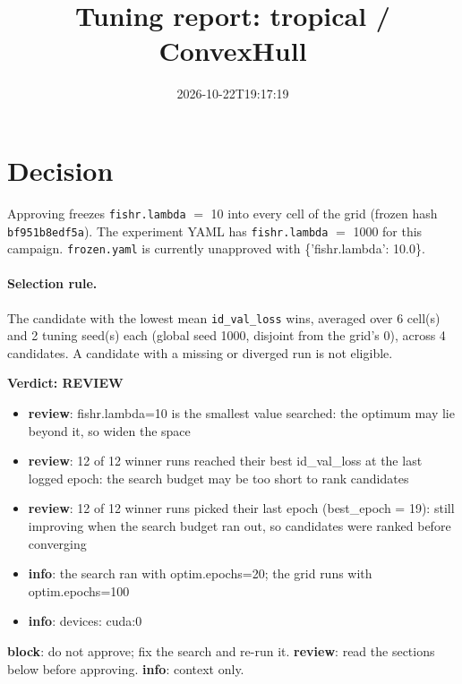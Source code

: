 \documentclass[10pt]{article}
\title{Tuning report: tropical / ConvexHull}
\date{2026-10-22T19:17:19}
\begin{document}
\maketitle

\section{Decision}
Approving freezes
\texttt{fishr.lambda} $=$ 10 into every cell of the grid (frozen hash \texttt{bf951b8edf5a}).
The experiment YAML has
\texttt{fishr.lambda} $=$ 1000 for this campaign.
\texttt{frozen.yaml} is currently unapproved with \{'fishr.lambda': 10.0\}.

\paragraph{Selection rule.} The candidate with the lowest mean \texttt{id\_val\_loss} wins, averaged over 6 cell(s) and 2 tuning seed(s) each (global seed 1000, disjoint from the grid's 0), across 4 candidates. A candidate with a missing or diverged run is not eligible.

\begin{framed}
\noindent\textbf{Verdict: \textcolor{orange!85!black}{REVIEW}}
\begin{itemize}\setlength\itemsep{0pt}
\item \textbf{review}: fishr.lambda=10 is the smallest value searched: the optimum may lie beyond it, so widen the space
\item \textbf{review}: 12 of 12 winner runs reached their best id\_val\_loss at the last logged epoch: the search budget may be too short to rank candidates
\item \textbf{review}: 12 of 12 winner runs picked their last epoch (best\_epoch = 19): still improving when the search budget ran out, so candidates were ranked before converging
\item \textbf{info}: the search ran with optim.epochs=20; the grid runs with optim.epochs=100
\item \textbf{info}: devices: cuda:0
\end{itemize}
\end{framed}
\noindent\textbf{block}: do not approve; fix the search and re-run it. \textbf{review}: read the sections below before approving. \textbf{info}: context only.
\end{document}
